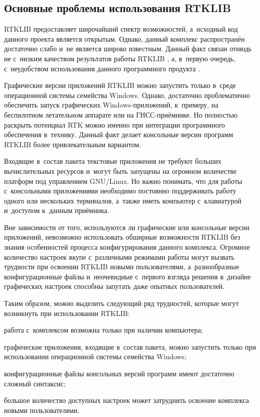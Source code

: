 \subsection{Основные проблемы использования RTKLIB}
\label{subsec:rtklib-problems}

RTKLIB предоставляет широчайший спектр возможностей, а~исходный код данного проекта является открытым. Однако, данный комплекс распространён достаточно слабо и~не является широко известным. Данный факт связан отнюдь не с~низким качеством результатов работы RTKLIB \cite{RtklibComparison}, а, в~первую очередь, с~неудобством использования данного программного продукта \cite{RtklibComparison}.

Графические версии приложений RTKLIB можно запустить только в~среде операционной системы семейства Windows. Однако, достаточно проблематично обеспечить запуск графических Windows-приложений, к~примеру, на беспилотном летательном аппарате или на ГНСС-приёмнике. Но полностью раскрыть потенциал RTK можно именно при интеграции программного обеспечения в~технику. Данный факт делает консольные версии программ RTKLIB более привлекательным вариантом.

Входящие в~состав пакета текстовые приложения не требуют больших вычислительных ресурсов и~могут быть запущены на огромном количестве платформ под управлением GNU/Linux. Но важно понимать, что для работы с~консольными приложениями необходимо постоянно поддерживать работу одного или нескольких терминалов, а~также иметь компьютер с~клавиатурой и~доступом к~данным приёмника.

Вне зависимости от того, используются ли графические или консольные версии приложений, невозможно использовать обширные возможности RTKLIB без знания особенностей процесса конфигурирования данного комплекса. Огромное количество настроек вкупе с~различными режимами работы могут вызвать трудности при освоении RTKLIB новыми пользователями, а~разнообразные конфигурационные файлы и~неочевидные с~первого взгляда решения в~дизайне графических настроек способны запутать даже опытных пользователей.

Таким образом, можно выделить следующий ряд трудностей, которые могут возникнуть при использовании RTKLIB:

\begin{dashitemize}
  \item работа с~комплексом возможна только при наличии компьютера;
  \item графические приложения, входящие в~состав пакета, можно запустить только при использовании операционной системы семейства Windows;
  \item конфигурационные файлы консольных версий программ имеют достаточно сложный синтаксис;
  \item большое количество доступных настроек может затруднить освоение комплекса новыми пользователями.
\end{dashitemize}

